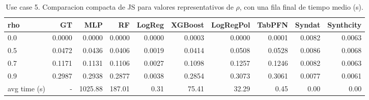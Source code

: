 \begin{table}
\caption{Use case 5. Comparacion compacta de JS para valores representativos de $\rho$, con una fila final de tiempo medio (s).}
\label{tab:uc5_js_compact}
\begin{tabular}{lrrrrrrrrr}
\toprule
rho & GT & MLP & RF & LogReg & XGBoost & LogRegPol & TabPFN & Syndat & Synthcity \\
\midrule
0.0 & 0.0000 & 0.0000 & 0.0000 & 0.0000 & 0.0003 & 0.0000 & 0.0001 & 0.0082 & 0.0063 \\
0.5 & 0.0472 & 0.0436 & 0.0406 & 0.0019 & 0.0414 & 0.0508 & 0.0528 & 0.0086 & 0.0068 \\
0.7 & 0.1171 & 0.1131 & 0.1106 & 0.0027 & 0.1098 & 0.1257 & 0.1246 & 0.0082 & 0.0063 \\
0.9 & 0.2987 & 0.2938 & 0.2877 & 0.0038 & 0.2854 & 0.3073 & 0.3061 & 0.0077 & 0.0061 \\
\midrule
avg time (s) & - & 1025.88 & 187.01 & 0.31 & 75.41 & 32.29 & 0.45 & 0.00 & 0.00 \\
\bottomrule
\end{tabular}
\end{table}
